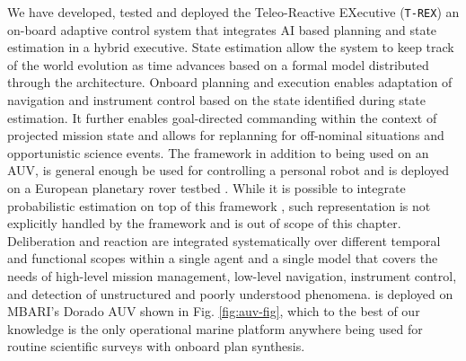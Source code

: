 We have developed, tested and deployed the Teleo-Reactive EXecutive
(\texttt{T-REX}) an on-board adaptive control system that integrates
AI based planning and %
state estimation in a hybrid executive\cite{mcgann08a,mcgann08b,py10}. 
State estimation allow the system to keep track of the world evolution
as time advances based on a formal model distributed through the architecture.
Onboard planning and execution enables adaptation of
navigation and instrument control based on the state identified during
state estimation.
It further enables goal-directed
commanding within the context of projected mission state and allows
for replanning for off-nominal situations and opportunistic science
events. The framework in addition to being used on an AUV, is general
enough be used for controlling a personal robot \cite{mcgann2009} and
is deployed on a European planetary rover testbed
\cite{goac11}. While it is possible to integrate probabilistic
estimation on top of this framework \cite{mcgann08d}, such
representation is not explicitly handled by the framework and is
out of scope of this chapter.
Deliberation and reaction are integrated systematically over different temporal and
functional scopes within a single agent and a single model that covers
the needs of high-level mission management, low-level navigation,
instrument control, and detection of unstructured and poorly
understood phenomena. \rx is deployed on MBARI's Dorado AUV shown in
Fig. \ref{fig:auv-fig}, which to the best of our knowledge is the only
operational marine platform anywhere being used for routine scientific
surveys with onboard plan synthesis.

